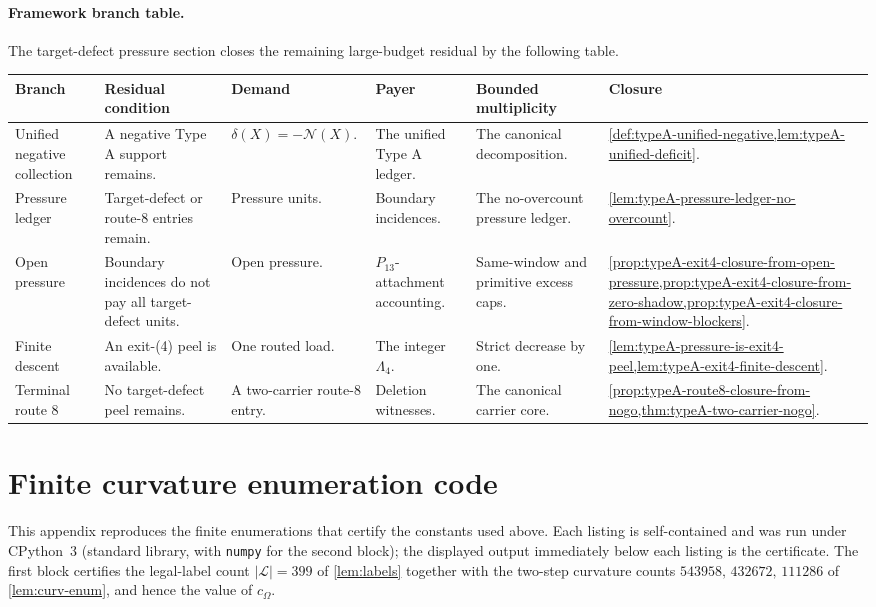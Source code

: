 \documentclass[11pt]{article}
\newcommand{\labels}{\mathcal L}
\newcommand{\No}{\mathcal N}
\newcommand{\FrameworkBranchTableHeader}{%
\toprule
\textbf{Branch} & \textbf{Residual condition} & \textbf{Demand} & \textbf{Payer} & \textbf{Bounded multiplicity} & \textbf{Closure}\\
\midrule
}
\begin{document}
\paragraph{Framework branch table.}
The target-defect pressure section closes the remaining large-budget residual
by the following table.
\begin{longtable}{L{0.13\textwidth} L{0.19\textwidth} L{0.14\textwidth} L{0.14\textwidth} L{0.17\textwidth} L{0.17\textwidth}}
\FrameworkBranchTableHeader
Unified negative collection
&
A negative Type A support remains.
&
\(\delta(X)=-\No(X)\).
&
The unified Type A ledger.
&
The canonical decomposition.
&
\cref{def:typeA-unified-negative,lem:typeA-unified-deficit}.
\\
\addlinespace
Pressure ledger
&
Target-defect or route-8 entries remain.
&
Pressure units.
&
Boundary incidences.
&
The no-overcount pressure ledger.
&
\cref{lem:typeA-pressure-ledger-no-overcount}.
\\
\addlinespace
Open pressure
&
Boundary incidences do not pay all target-defect units.
&
Open pressure.
&
\(P_{13}\)-attachment accounting.
&
Same-window and primitive excess caps.
&
\cref{prop:typeA-exit4-closure-from-open-pressure,prop:typeA-exit4-closure-from-zero-shadow,prop:typeA-exit4-closure-from-window-blockers}.
\\
\addlinespace
Finite descent
&
An exit-\textup{(4)} peel is available.
&
One routed load.
&
The integer \(\Lambda_4\).
&
Strict decrease by one.
&
\cref{lem:typeA-pressure-is-exit4-peel,lem:typeA-exit4-finite-descent}.
\\
\addlinespace
Terminal route 8
&
No target-defect peel remains.
&
A two-carrier route-8 entry.
&
Deletion witnesses.
&
The canonical carrier core.
&
\cref{prop:typeA-route8-closure-from-nogo,thm:typeA-two-carrier-nogo}.
\\
\bottomrule
\end{longtable}


\appendix

\section{Finite curvature enumeration code}\label{app:curv-code}

This appendix reproduces the finite enumerations that certify the constants used above.  Each listing is self-contained and was run under CPython~3 (standard library, with \texttt{numpy} for the second block); the displayed output immediately below each listing is the certificate.  The first block certifies the legal-label count $|\labels|=399$ of \cref{lem:labels} together with the two-step curvature counts $543958,\,432672,\,111286$ of \cref{lem:curv-enum}, and hence the value of $c_\Omega$.
\end{document}
